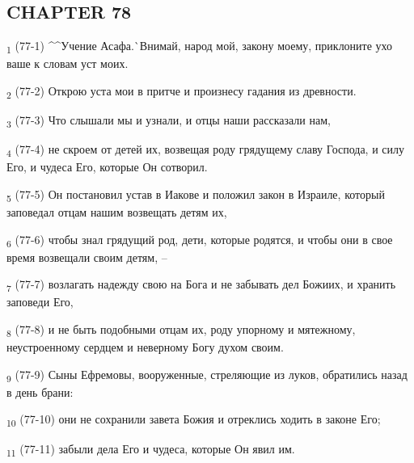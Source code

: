 \subsection{CHAPTER 78}
\begin{tcolorbox}
\textsubscript{1} (77-1) ^^Учение Асафа.^^ Внимай, народ мой, закону моему, приклоните ухо ваше к словам уст моих.
\end{tcolorbox}
\begin{tcolorbox}
\textsubscript{2} (77-2) Открою уста мои в притче и произнесу гадания из древности.
\end{tcolorbox}
\begin{tcolorbox}
\textsubscript{3} (77-3) Что слышали мы и узнали, и отцы наши рассказали нам,
\end{tcolorbox}
\begin{tcolorbox}
\textsubscript{4} (77-4) не скроем от детей их, возвещая роду грядущему славу Господа, и силу Его, и чудеса Его, которые Он сотворил.
\end{tcolorbox}
\begin{tcolorbox}
\textsubscript{5} (77-5) Он постановил устав в Иакове и положил закон в Израиле, который заповедал отцам нашим возвещать детям их,
\end{tcolorbox}
\begin{tcolorbox}
\textsubscript{6} (77-6) чтобы знал грядущий род, дети, которые родятся, и чтобы они в свое время возвещали своим детям, --
\end{tcolorbox}
\begin{tcolorbox}
\textsubscript{7} (77-7) возлагать надежду свою на Бога и не забывать дел Божиих, и хранить заповеди Его,
\end{tcolorbox}
\begin{tcolorbox}
\textsubscript{8} (77-8) и не быть подобными отцам их, роду упорному и мятежному, неустроенному сердцем и неверному Богу духом своим.
\end{tcolorbox}
\begin{tcolorbox}
\textsubscript{9} (77-9) Сыны Ефремовы, вооруженные, стреляющие из луков, обратились назад в день брани:
\end{tcolorbox}
\begin{tcolorbox}
\textsubscript{10} (77-10) они не сохранили завета Божия и отреклись ходить в законе Его;
\end{tcolorbox}
\begin{tcolorbox}
\textsubscript{11} (77-11) забыли дела Его и чудеса, которые Он явил им.
\end{tcolorbox}
